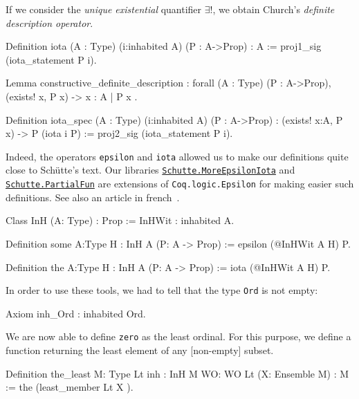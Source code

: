 If we consider the \emph{unique existential} quantifier $\exists!$, we obtain
Church's \emph{definite description operator}.

\begin{Coqsrc}
Definition iota (A : Type) (i:inhabited A) (P : A->Prop) : A
  := proj1_sig (iota_statement P i).
\end{Coqsrc}


\begin{Coqsrc}
 Lemma constructive_definite_description :
  forall (A : Type) (P : A->Prop),
    (exists! x, P x) -> { x : A | P x }.
\end{Coqsrc}


\begin{Coqsrc}
Definition iota_spec (A : Type) (i:inhabited A) (P : A->Prop) :
  (exists! x:A, P x) -> P (iota i P)
  := proj2_sig (iota_statement P i).
\end{Coqsrc}



Indeed, the operators \texttt{epsilon} and \texttt{iota} allowed us to make our definitions 
quite close to Schütte's text. Our libraries \href{../theories/html/hydras.Schutte.MoreEpsilonIota.html}%
{\texttt{Schutte.MoreEpsilonIota}}
and
\href{../theories/html/hydras.Schutte.PartialFun.html}%
{\texttt{Schutte.PartialFun}} are extensions of \texttt{Coq.logic.Epsilon} for making easier 
such definitions. See also an article in french~\cite{PCiota}. 



\begin{Coqsrc}
Class InH (A: Type) : Prop :=
   InHWit : inhabited A.

Definition some {A:Type} {H : InH A} (P: A -> Prop) := 
   epsilon (@InHWit A H) P.

Definition the {A:Type} {H : InH A} (P: A -> Prop) := 
   iota (@InHWit A H) P.
\end{Coqsrc}

In order to use these tools,  we had to tell \coq{}  that the type \texttt{Ord} is not empty:

\begin{Coqsrc}
Axiom inh_Ord : inhabited Ord.
\end{Coqsrc}


We are now able to define \texttt{zero} as the least ordinal. For this purpose,
we define a function returning the least element of any [non-empty]  subset.


\begin{Coqsrc}
Definition the_least {M: Type} {Lt}
           {inh : InH M} {WO: WO Lt} (X: Ensemble M)  : M :=
  the  (least_member  Lt X ).
\end{Coqsrc}


